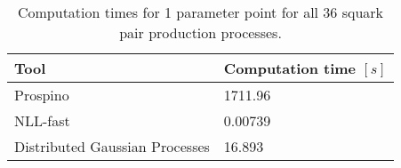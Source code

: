 \documentclass[twoside,english]{uiofysmaster}
\begin{document}
\begin{table}
\centering
\begin{tabular}{@{}ll@{}} \toprule
Tool & Computation time $[s]$\\ \midrule
Prospino & 1711.96 \\
NLL-fast & 0.00739\\
Distributed Gaussian Processes & 16.893\\
\bottomrule
\end{tabular}
\caption{Computation times for 1 parameter point for all 36 squark pair production processes.}
\label{Tab :: results : Computation times}
\end{table}










\end{document}
